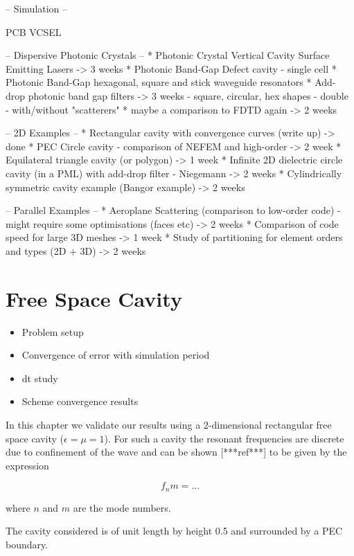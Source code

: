 
-- Simulation  --

PCB VCSEL

-- Dispersive Photonic Crystals --
* Photonic Crystal Vertical Cavity Surface Emitting Lasers -> 3 weeks
  * Photonic Band-Gap Defect cavity - single cell
  * Photonic Band-Gap hexagonal, square and stick waveguide resonators
* Add-drop photonic band gap filters  -> 3 weeks
  - square, circular, hex shapes
  - double
  - with/without "scatterers"
* maybe a comparison to FDTD again -> 2 weeks

-- 2D Examples --
* Rectangular cavity with convergence curves (write up) -> done
* PEC Circle cavity - comparison of NEFEM and high-order -> 2 week
* Equilateral triangle cavity (or polygon) -> 1 week
* Infinite 2D dielectric circle cavity (in a PML) with add-drop filter - Niegemann -> 2 weeks
* Cylindrically symmetric cavity example (Bangor example) -> 2 weeks
 
-- Parallel Examples --
* Aeroplane Scattering (comparison to low-order code) - might require some optimisations (faces etc) -> 2 weeks
* Comparison of code speed for large 3D meshes -> 1 week
* Study of partitioning for element orders and types (2D + 3D) -> 2 weeks


\chapter{Free Space Cavity} %
\label{Chapter3}

\begin{itemize}
	\item Problem setup
  \item Convergence of error with simulation period
  \item dt study
  \item Scheme convergence results
\end{itemize}

In this chapter we validate our results using a 2-dimensional rectangular free space cavity ($\epsilon=\mu=1$). For such a cavity the resonant frequencies are discrete due to confinement of the wave and can be shown [***ref***] to be given by the expression

$$
f_nm = ...
$$

where $n$ and $m$ are the mode numbers.

The cavity considered is of unit length by height 0.5 %
and surrounded by a PEC boundary.

